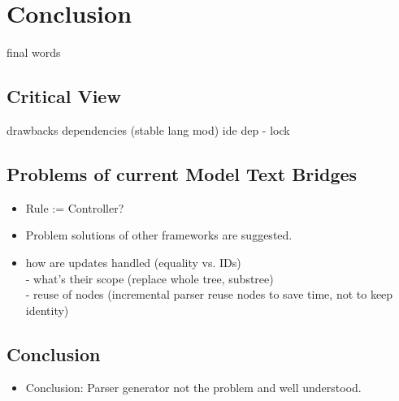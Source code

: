 \chapter{Conclusion}
final words

\section{Critical View}
drawbacks 
dependencies (stable lang mod)
ide dep - lock

\section{Problems of current Model Text Bridges}
\begin{itemize}
	\item Rule := Controller?
	\item Problem solutions of other frameworks are suggested.
\item how are updates handled (equality vs. IDs) \\
		- what's their scope (replace whole tree, substree) \\
		-	reuse of nodes (incremental parser reuse nodes to save time, not to keep identity)
\end{itemize}	


\section{Conclusion}
\begin{itemize}
	\item Conclusion: Parser generator not the problem and well understood.
\end{itemize}	